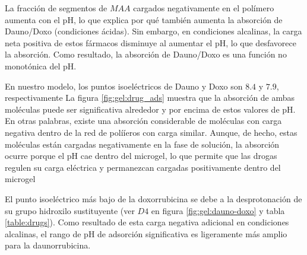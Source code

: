 La fracci\'on de segmentos de $MAA$ cargados negativamente en el pol\'imero aumenta con el pH, lo que explica por qu\'e tambi\'en aumenta la absorci\'on de Dauno/Doxo (condiciones \'acidas).
Sin embargo, en condiciones alcalinas, la carga neta positiva de estos f\'armacos disminuye al aumentar el pH, lo que desfavorece la absorci\'on.
Como resultado, la absorci\'on de Dauno/Doxo es una funci\'on no monot\'onica del pH.



En nuestro modelo, los puntos isoel\'ectricos de Dauno y Doxo son $8.4$ y $7.9$, respectivamente%
La figura \ref{fig:gel:drug_ads} muestra que la absorci\'on de ambas mol\'eculas puede ser significativa alrededor y por encima de estos valores de pH.
En otras palabras, existe una absorci\'on considerable de mol\'eculas con carga negativa dentro de la red de polí\'ieros con carga similar.
Aunque, de hecho, estas mol\'eculas est\'an cargadas negativamente en la fase de soluci\'on, la absorci\'on ocurre porque el pH cae dentro del microgel, lo que permite que las drogas regulen su carga el\'ectrica y permanezcan cargadas positivamente dentro del microgel %


El punto isoel\'ectrico m\'as bajo de la doxorrubicina se debe a la desprotonaci\'on de su grupo hidroxilo sustituyente (ver $D4$ en figura \ref{fig:gel:dauno-doxo} y tabla \ref{table:drugs}).
Como resultado de esta carga negativa adicional en condiciones alcalinas, el rango de pH de adsorci\'on significativa es ligeramente m\'as amplio para la daunorrubicina.